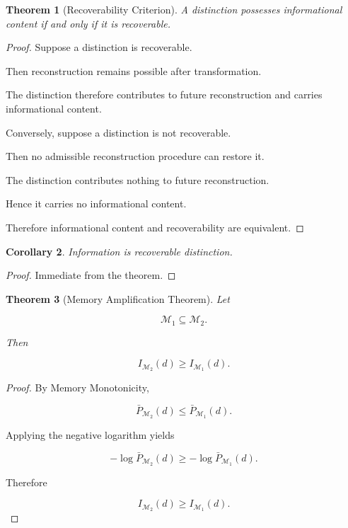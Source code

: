 \documentclass[12pt,oneside]{article}
\newtheorem{theorem}{Theorem}[section] \newtheorem{lemma}[theorem]{Lemma} \newtheorem{proposition}[theorem]{Proposition} \newtheorem{corollary}[theorem]{Corollary}
\theoremstyle{definition}
\begin{document}
\begin{theorem}[Recoverability Criterion]

A distinction possesses informational content if and only if it is recoverable.

\end{theorem}

\begin{proof}

Suppose a distinction is recoverable.

Then reconstruction remains possible after transformation.

The distinction therefore contributes to future reconstruction and carries informational content.

Conversely, suppose a distinction is not recoverable.

Then no admissible reconstruction procedure can restore it.

The distinction contributes nothing to future reconstruction.

Hence it carries no informational content.

Therefore informational content and recoverability are equivalent.

\end{proof}

\begin{corollary}

Information is recoverable distinction.

\end{corollary}

\begin{proof}

Immediate from the theorem.

\end{proof}

\begin{theorem}[Memory Amplification Theorem]

Let

\[
\mathcal M_1
\subseteq
\mathcal M_2.
\]

Then

\[
I_{\mathcal M_2}(d)
\ge
I_{\mathcal M_1}(d).
\]

\end{theorem}

\begin{proof}

By Memory Monotonicity,

\[
\bar P_{\mathcal M_2}(d)
\le
\bar P_{\mathcal M_1}(d).
\]

Applying the negative logarithm yields

\[
-\log \bar P_{\mathcal M_2}(d)
\ge
-\log \bar P_{\mathcal M_1}(d).
\]

Therefore

\[
I_{\mathcal M_2}(d)
\ge
I_{\mathcal M_1}(d).
\]

\end{proof}
\end{document}

